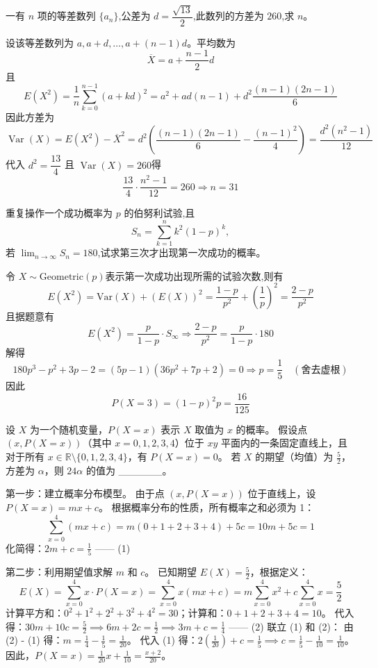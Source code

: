 \begin{questions}
    \question 一有 $n$ 项的等差数列 $\{a_n\}$,公差为 $d=\dfrac{\sqrt{13}}{2}$,此数列的方差为 $260$,求 $n$。
    \begin{solution}
        设该等差数列为 $a,a+d,\dots,a+(n-1)d$。平均数为
        \[
        \overline{X}=a+\frac{n-1}{2}d
        \]
        且
        \[
        E(X^2)=\frac{1}{n}\sum_{k=0}^{n-1}(a+kd)^2
        =a^2+ad(n-1)+d^2\frac{(n-1)(2n-1)}{6}
        \]
        因此方差为
        \[
        \operatorname{Var}(X)=E(X^2)-\overline{X}^2
        =d^2\left(\frac{(n-1)(2n-1)}{6}-\frac{(n-1)^2}{4}\right)
        =\frac{d^2(n^2-1)}{12}
        \]
        代入 $d^2=\dfrac{13}{4}$ 且 $\operatorname{Var}(X)=260$得
        \[
        \frac{13}{4}\cdot\frac{n^2-1}{12}=260 \Rightarrow n=31
        \]
    \end{solution}

    \question 重复操作一个成功概率为 $p$ 的伯努利试验,且 $$S_n = \sum_{k=1}^{n} k^2 (1-p)^k,$$若 $\displaystyle\lim_{n \to \infty} S_n = 180$,试求第三次才出现第一次成功的概率。
    \begin{solution}
        令 $X \sim \text{Geometric}(p)$表示第一次成功出现所需的试验次数,则有
        \[
        E(X^2) = \text{Var}(X) + (E(X))^2 = \dfrac{1-p}{p^2} + \left(\dfrac{1}{p}\right)^2 = \dfrac{2 - p}{p^2}
        \]
        且据题意有
        \[
        E(X^2) = \dfrac{p}{1 - p} \cdot S_\infty
        \Rightarrow \dfrac{2 - p}{p^2} = \dfrac{p}{1 - p} \cdot 180
        \]
        解得
        \[
        180p^3 - p^2 + 3p - 2 =(5p - 1)(36p^2 + 7p + 2) = 0
        \Rightarrow p = \dfrac{1}{5} \quad (\text{舍去虚根})
        \]
        因此
        \[
        P(X = 3) = (1 - p)^2p  = \dfrac{16}{125}
        \]
    \end{solution}

    \question
设 $X$ 为一个随机变量，$P(X = x)$ 表示 $X$ 取值为 $x$ 的概率。
假设点 $(x, P(X = x))$（其中 $x = 0, 1, 2, 3, 4$）位于 $xy$ 平面内的一条固定直线上，且对于所有 $x \in \mathbb{R} \setminus \{0, 1, 2, 3, 4\}$，有 $P(X = x) = 0$。
若 $X$ 的期望（均值）为 $\frac{5}{2}$，方差为 $\alpha$，则 $24\alpha$ 的值为 \_\_\_\_\_\_。

\begin{solution}
第一步：建立概率分布模型。
由于点 $(x, P(X = x))$ 位于直线上，设 $P(X = x) = mx + c$。
根据概率分布的性质，所有概率之和必须为 1：
\[
\sum_{x=0}^{4} (mx + c) = m(0+1+2+3+4) + 5c = 10m + 5c = 1
\]
化简得：$2m + c = \frac{1}{5}$ \quad —— (1)

第二步：利用期望值求解 $m$ 和 $c$。
已知期望 $E(X) = \frac{5}{2}$，根据定义：
\[
E(X) = \sum_{x=0}^{4} x \cdot P(X = x) = \sum_{x=0}^{4} x(mx + c) = m \sum_{x=0}^{4} x^2 + c \sum_{x=0}^{4} x = \frac{5}{2}
\]
计算平方和：$0^2+1^2+2^2+3^2+4^2 = 30$；计算和：$0+1+2+3+4 = 10$。
代入得：$30m + 10c = \frac{5}{2} \implies 6m + 2c = \frac{1}{2} \implies 3m + c = \frac{1}{4}$ \quad —— (2)
联立 (1) 和 (2)：
由 (2) - (1) 得：$m = \frac{1}{4} - \frac{1}{5} = \frac{1}{20}$。
代入 (1) 得：$2(\frac{1}{20}) + c = \frac{1}{5} \implies c = \frac{1}{5} - \frac{1}{10} = \frac{1}{10}$。
因此，$P(X = x) = \frac{1}{20}x + \frac{1}{10} = \frac{x+2}{20}$。


\end{solution}
\end{questions}
